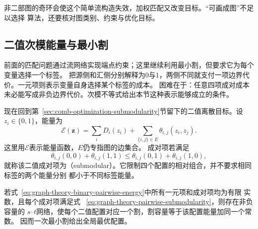 非二部图的奇环会使这个简单流构造失效，加权匹配又改变目标。“可画成图”不足以选择
算法，还要核对图类别、约束与优化目标。

\subsection{二值次模能量与最小割}

前面的匹配问题通过流网络实现端点约束；这里继续利用最小割，但要求它为每个变量选择一个标签。
把源侧和汇侧分别解释为\(0\)与\(1\)，两侧不同就支付一项边界代价。一元项则表示变量自身选择某个标签的成本。
困难在于：任意四项成对成本未必能写成非负边界代价。次模不等式给出本节这种表示能够成立的条件。

现在回到第~\ref{sec:comb-optimization-submodularity}节留下的二值离散目标。设
\(z_i\in\{0,1\}\)，能量为
\begin{equation}
  \mathcal{E}(\bm{z})=\sum_i D_i(z_i)+
  \sum_{\{i,j\}\in E}\theta_{i,j}(z_i,z_j).
  \label{eq:graph-theory-binary-pairwise-energy}
\end{equation}
这里用\(\mathcal{E}\)表示能量函数，\(E\)仍专指图的边集合。
成对项若满足
\begin{equation}
  \theta_{i,j}(0,0)+\theta_{i,j}(1,1)
  \leq
  \theta_{i,j}(0,1)+\theta_{i,j}(1,0),
  \label{eq:graph-theory-pairwise-submodularity}
\end{equation}
就称该二值成对项为（submodular）。它限制四个配置的相对组合，并不要求相同标签的两个能量分别
都小于不同标签能量。

\begin{theorem}[二值次模成对能量的割表示]
  \label{thm:graph-theory-submodular-cut-representation}
  若式~\eqref{eq:graph-theory-binary-pairwise-energy}中所有一元项和成对项均为有限
  实数，且每个成对项满足式
  ~\eqref{eq:graph-theory-pairwise-submodularity}，则存在非负容量的
  \(s\)--\(t\)网络，使每个二值配置对应一个割，割容量等于该配置能量加同一个常数。
  因而一次最小割给出全局最优配置。
\end{theorem}

